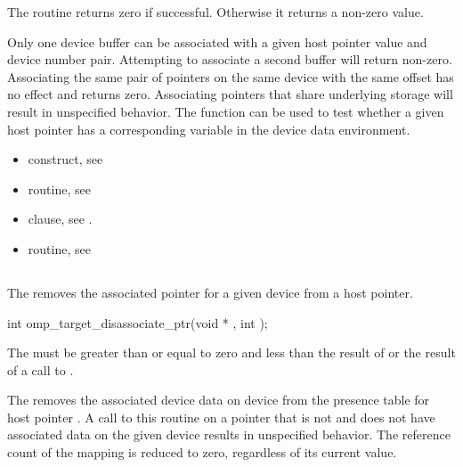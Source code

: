The routine returns zero if successful. Otherwise it returns a non-zero value.

Only one device buffer can be associated with a given host pointer value and
device number pair. Attempting to associate a second buffer will return
non-zero. Associating the same pair of pointers on the same device with the
same offset has no effect and returns zero.  Associating pointers that share
underlying storage will result in unspecified behavior. The
 function can be used to test whether a given
host pointer has a corresponding variable in the device data environment.

\crossreferences
\begin{itemize}
\item {} construct, see 
\item {} routine, see 
\item {} clause, see 
.
\item {} routine, see 
\end{itemize}

\subsection{}
\label{subsec:omp_target_disassociate_ptr}
\summary

The  removes the associated pointer for a
given device from a host pointer.

\pagebreak
{}
\format
\begin{boxedcode}
int omp\_target\_disassociate\_ptr(void * , int );
\end{boxedcode}

\constraints


The 
must be greater than or equal to zero and less than the result of
 or the result of a call to
.

\effect

The  removes the associated device data
on device  from the presence table for host pointer
. A call to this routine on a pointer that is not 
 and does not have associated data on the given device results
in unspecified behavior.  The reference count of the mapping is reduced to 
zero, regardless of its current value.

